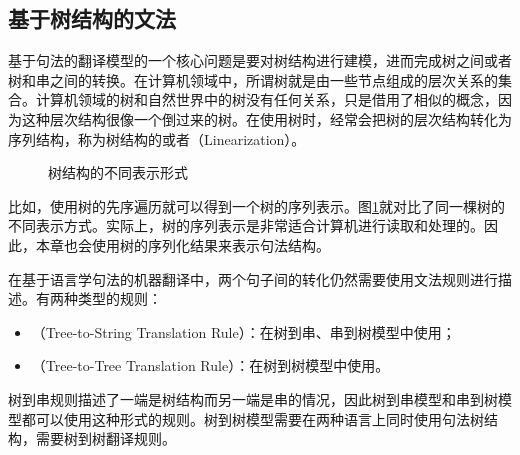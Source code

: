 
\subsection{基于树结构的文法}

\parinterval 基于句法的翻译模型的一个核心问题是要对树结构进行建模，进而完成树之间或者树和串之间的转换。在计算机领域中，所谓树就是由一些节点组成的层次关系的集合。计算机领域的树和自然世界中的树没有任何关系，只是借用了相似的概念，因为这种层次结构很像一个倒过来的树。在使用树时，经常会把树的层次结构转化为序列结构，称为树结构的{\small{}}或者{\small{}}（Linearization）。

\begin{figure}[htp]
\centering

\caption{树结构的不同表示形式}
\label{fig:4-45}
\end{figure}

\parinterval 比如，使用树的先序遍历就可以得到一个树的序列表示。图\ref{fig:4-45}就对比了同一棵树的不同表示方式。实际上，树的序列表示是非常适合计算机进行读取和处理的。因此，本章也会使用树的序列化结果来表示句法结构。

\parinterval 在基于语言学句法的机器翻译中，两个句子间的转化仍然需要使用文法规则进行描述。有两种类型的规则：

\begin{itemize}
\vspace{0.5em}
\item {\small{}}（Tree-to-String Translation Rule）：在树到串、串到树模型中使用；
\vspace{0.5em}
\item {\small{}}（Tree-to-Tree Translation Rule）：在树到树模型中使用。
\vspace{0.5em}
\end{itemize}

\parinterval 树到串规则描述了一端是树结构而另一端是串的情况，因此树到串模型和串到树模型都可以使用这种形式的规则。树到树模型需要在两种语言上同时使用句法树结构，需要树到树翻译规则。

